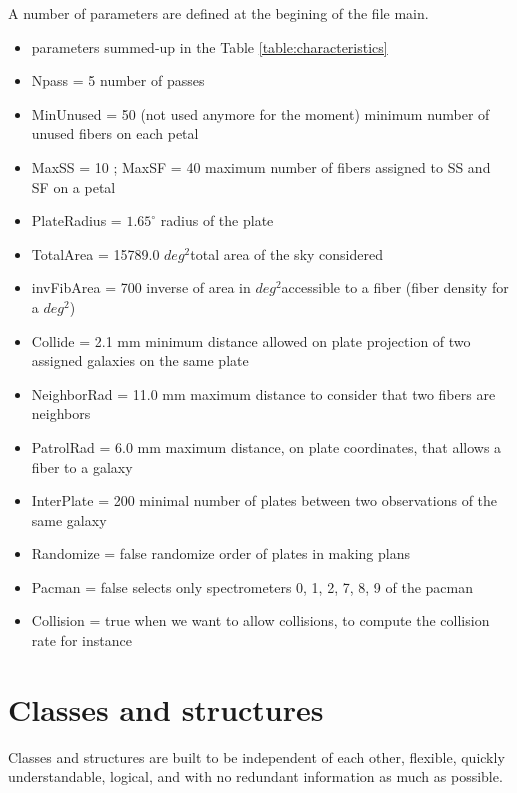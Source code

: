\documentclass{extarticle}
\def\sqd{$deg^{2}$}
\begin{document}
A number of parameters are defined at the begining of the file main.
\begin{itemize} 
	\item parameters summed-up in the Table \ref{table:characteristics}
	\item Npass = 5 number of passes
	\item MinUnused = 50 (not used anymore for the moment) minimum number of unused fibers on each petal
	\item MaxSS = 10 ; MaxSF = 40 maximum number of fibers assigned to SS and SF on a petal
	\item PlateRadius = $1.65^{\circ}$ radius of the plate
	\item TotalArea = 15789.0 \sqd total area of the sky considered
	\item invFibArea = 700 inverse of area in \sqd accessible to a fiber (fiber density for a \sqd)
	\item Collide = 2.1 mm minimum distance allowed on plate projection of two assigned galaxies on the same plate
	\item NeighborRad = 11.0 mm maximum distance to consider that two fibers are neighbors
	\item PatrolRad = 6.0 mm maximum distance, on plate coordinates, that allows a fiber to a galaxy
	\item InterPlate = 200 minimal number of plates between two observations of the same galaxy
	\item Randomize = false randomize order of plates in making plans
	\item Pacman = false selects only spectrometers 0, 1, 2, 7, 8, 9 of the pacman
	\item Collision = true when we want to allow collisions, to compute the collision rate for instance
\end{itemize} 


\section{Classes and structures}
Classes and structures are built to be independent of each other, flexible, quickly understandable, logical, and with no redundant information as much as possible.
\end{document}
